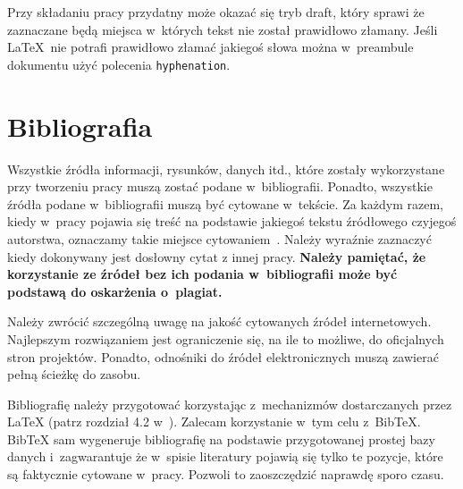 Przy składaniu pracy przydatny może okazać się tryb draft, który sprawi że
zaznaczane będą miejsca w~których tekst nie został prawidłowo złamany. Jeśli
\LaTeX~nie potrafi prawidłowo złamać jakiegoś słowa można w~preambule dokumentu
użyć polecenia \texttt{hyphenation}.

\section{Bibliografia}\label{sec:app:bibliografia}
Wszystkie źródła informacji, rysunków, danych itd., które zostały wykorzystane
przy tworzeniu pracy muszą zostać podane w~bibliografii. Ponadto, wszystkie
źródła podane w~bibliografii muszą być cytowane w~tekście. Za każdym razem,
kiedy w~pracy pojawia się treść na podstawie jakiegoś tekstu źródłowego czyjegoś
autorstwa, oznaczamy takie miejsce cytowaniem~\cite[str. 9]{Nie10}.  Należy
wyraźnie zaznaczyć kiedy dokonywany jest dosłowny cytat z innej pracy.
\textbf{Należy pamiętać, że korzystanie ze źródeł bez ich podania w~bibliografii
  może być podstawą do oskarżenia o~plagiat.}

Należy zwrócić szczególną uwagę na jakość cytowanych źródeł internetowych.
Najlepszym rozwiązaniem jest ograniczenie się, na ile to możliwe, do oficjalnych
stron projektów. Ponadto, odnośniki do źródeł elektronicznych muszą zawierać
pełną ścieżkę do zasobu.

Bibliografię należy przygotować korzystając z~mechanizmów dostarczanych przez
LaTeX (patrz rozdział 4.2 w~\cite{Oet11}). Zalecam korzystanie w~tym celu
z~BibTeX.  BibTeX sam wygeneruje bibliografię na podstawie przygotowanej prostej
bazy danych i~zagwarantuje że w~spisie literatury pojawią się tylko te pozycje,
które są faktycznie cytowane w~pracy. Pozwoli to zaoszczędzić naprawdę sporo
czasu.
